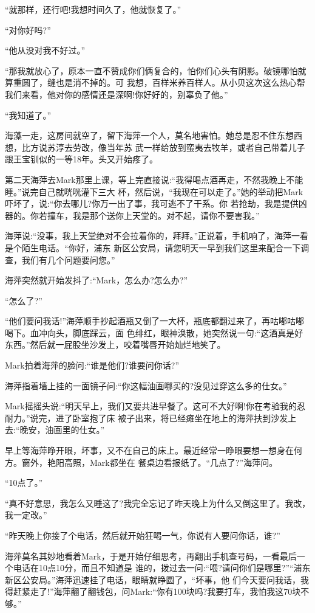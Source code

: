 \documentclass[11pt,a4paper,onecolumn]{article}
\begin{document}
``就那样，还行吧!我想时间久了，他就恢复了。''

``对你好吗?''

``他从没对我不好过。''

``那我就放心了，原本一直不赞成你们俩复合的，怕你们心头有阴影。破镜哪怕就算重圆了，缝也是消不掉的。可
我想，百样米养百样人。从小贝这次这么热心帮我们来看，他对你的感情还是深啊!你好好的，别辜负了他。''

``我知道了。''

海藻一走，这房间就空了，留下海萍一个人，莫名地害怕。她总是忍不住东想西想，比方说苏淳去劳改，像当年苏
武一样给放到蛮夷去牧羊，或者自己带着儿子跟王宝钏似的一等18年。头又开始疼了。

第二天海萍去Mark那里上课，等上完直接说:``我得喝点酒再走，不然我晚上不能睡。''说完自己就咣咣灌下三大
杯，然后说，``我现在可以走了。''她的举动把Mark吓坏了，说:``你去哪儿?你万一出了事，我可逃不了干系。你
若抢劫，我是提供凶器的。你若撞车，我是那个送你上天堂的。对不起，请你不要害我。''

海萍说:``没事，我上天堂绝对不会拉着你的，拜拜。''正说着，手机响了，海萍一看是个陌生电话。``你好，浦东
新区公安局，请您明天一早到我们这里来配合一下调查，我们有几个问题要问您。''

海萍突然就开始发抖了:``Mark，怎么办?怎么办?''

``怎么了?''

``他们要问我话!''海萍顺手抄起酒瓶又倒了一大杯，瓶底都翻过来了，再咕嘟咕嘟喝下。血冲向头，脚底踩云，面
色绯红，眼神涣散，她突然说一句:``这酒真是好东西。''然后就一屁股坐沙发上，咬着嘴唇开始灿烂地笑了。

Mark拍着海萍的脸问:``谁是他们?谁要问你话?''

海萍指着墙上挂的一面镜子问:``你这幅油画哪买的?没见过穿这么多的仕女。''

Mark摇摇头说:``明天早上，我们又要共进早餐了。这可不大好啊!你在考验我的忍耐力。''说完，进了卧室抱了床
被子出来，将已经瘫坐在地上的海萍扶到沙发上去:``晚安，油画里的仕女。''

早上等海萍睁开眼，坏事，又不在自己的床上。最近经常一睁眼要想一想身在何方。窗外，艳阳高照，Mark都坐在
餐桌边看报纸了。``几点了?''海萍问。

``10点了。''

``真不好意思，我怎么又睡这了?我完全忘记了昨天晚上为什么又倒这里了。我改，我一定改。''

``昨天晚上你接了个电话，然后就开始狂喝一气，你说有人要问你话，谁?''

海萍莫名其妙地看着Mark，于是开始仔细思考，再翻出手机查号码，一看最后一个电话在10点10分，而且不知道是
谁的，拨过去一问:``喂?请问你们是哪里?''``浦东新区公安局。''海萍迅速挂了电话，眼睛就睁圆了，``坏事，他
们今天要问我话，我得赶紧走了!''海萍翻了翻钱包，问Mark:``你有100块吗?我要打车，我怕我这70块不够。''
\end{document}
